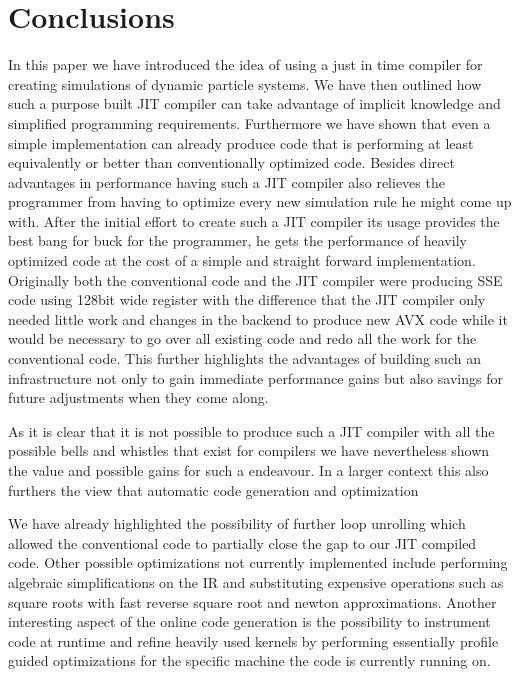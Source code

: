 \section{Conclusions}

In this paper we have introduced the idea of using a just in time compiler for creating simulations of dynamic particle systems. We have then outlined how such a purpose built JIT compiler can take advantage of implicit knowledge and simplified programming requirements. Furthermore we have shown that even a simple implementation can already produce code that is performing at least equivalently or better than conventionally optimized code. Besides direct advantages in performance having such a JIT compiler also relieves the programmer from having to optimize every new simulation rule he might come up with. After the initial effort to create such a JIT compiler its usage provides the best bang for buck for the programmer, he gets the performance of heavily optimized code at the cost of a simple and straight forward implementation. Originally both the conventional code and the JIT compiler were producing SSE code using 128bit wide register with the difference that the JIT compiler only needed little work and changes in the backend to produce new AVX code while it would be necessary to go over all existing code and redo all the work for the conventional code. This further highlights the advantages of building such an infrastructure not only to gain immediate performance gains but also savings for future adjustments when they come along.

As it is clear that it is not possible to produce such a JIT compiler with all the possible bells and whistles that exist for compilers we have nevertheless shown the value and possible gains for such a endeavour. In a larger context this also furthers the view that automatic code generation and optimization

 We have already highlighted the possibility of further loop unrolling which allowed the conventional code to partially close the gap to our JIT compiled code. Other possible optimizations not currently implemented include performing algebraic simplifications on the IR and substituting expensive operations such as square roots with fast reverse square root and newton approximations. Another interesting aspect of the online code generation is the possibility to instrument code at runtime and refine heavily used kernels by performing essentially profile guided optimizations for the specific machine the code is currently running on.
